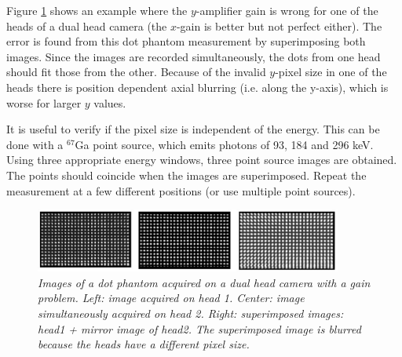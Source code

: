 \documentclass[11pt,oneside]{article}
\begin{document}
Figure \ref{fig:qc_gain} shows an example where the $y$-amplifier gain
is wrong for one of the heads of a dual head camera (the $x$-gain is
better but not perfect either). The error is found from this dot
phantom measurement by superimposing both images. Since the images are
recorded simultaneously, the dots from one head should fit those from
the other. Because of the invalid $y$-pixel size in one of the heads
there is position dependent axial blurring (i.e. along the y-axis),
which is worse for larger $y$ values.

It is useful to verify if the pixel size is independent of the energy. This
can be done with a $^{67}$Ga point source, which emits photons of 93, 184 and
296 keV. Using three appropriate energy windows, three point source images are
obtained. The points should coincide when the images are superimposed. Repeat
the measurement at a few different positions (or use multiple point sources).

\begin{figure}[tb]
\centering
\includegraphics[width=0.9\textwidth]{figs/fig_qc_gain.pdf}
\caption{\label{fig:qc_gain} \emph{Images of a dot phantom acquired on a dual
head camera with a gain problem. Left: image acquired on head 1. Center: image
simultaneously acquired on head 2. Right: superimposed images: head1 + mirror
image of head2. The superimposed image is blurred because the heads have a
different pixel size.}}
\end{figure}
\end{document}
